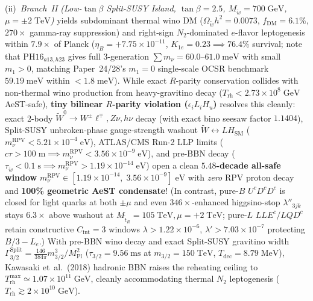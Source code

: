 \documentclass[11pt,a4paper]{article}
\begin{document}
\begin{enumerate}
\begin{itemize}
        (ii)~\emph{Branch~II (Low-$\tan\beta$ Split-SUSY Island, $\tan\beta=2.5$, $M_{\tilde w}=700\;\mathrm{GeV}$, $\mu=\pm 2\;\mathrm{TeV}$)} yields subdominant thermal wino DM ($\Omega_{\tilde w} h^2 = 0.0073$, $f_{\mathrm{DM}} = 6.1\%$, $270\times$ gamma-ray suppression) and right-sign $N_2$-dominated $e$-flavor leptogenesis within $7.9\times$ of Planck ($\eta_B = +7.75\times 10^{-11}$, $K_{1e}=0.23 \implies 76.4\%$ survival; note that $\mathrm{PH16}_{a13,h23}$ gives full 3-generation $\sum m_\nu = 60.0\text{--}61.0\;\mathrm{meV}$ with small $m_1>0$, matching Paper~24/28's $m_1=0$ single-scale OCSR benchmark $59.19\;\mathrm{meV}$ within $<1.8\;\mathrm{meV}$). While exact $R$-parity conservation collides with non-thermal wino production from heavy-gravitino decay ($T_{\mathrm{rh}} < 2.73\times 10^8\;\mathrm{GeV}$ AeST-safe), \textbf{tiny bilinear $R$-parity violation ($\epsilon_i L_i H_u$)} resolves this cleanly: exact 2-body $\tilde W^0 \to W^\pm\ell^\mp, Z\nu, h\nu$ decay (with exact bino seesaw factor $1.1404$), Split-SUSY unbroken-phase gauge-strength washout $\tilde W \leftrightarrow L H_{\mathrm{SM}}$ ($m_\nu^{\mathrm{RPV}} < 5.21\times 10^{-4}\;\mathrm{eV}$), ATLAS/CMS Run-2 LLP limits ($c\tau > 100\;\mathrm{m} \implies m_\nu^{\mathrm{RPV}} < 3.56\times 10^{-9}\;\mathrm{eV}$), and pre-BBN decay ($\tau_{\tilde w} < 0.1\;\mathrm{s} \implies m_\nu^{\mathrm{RPV}} > 1.19\times 10^{-14}\;\mathrm{eV}$) open a clean \textbf{$5.48$-decade all-safe window} $m_\nu^{\mathrm{RPV}} \in [1.19\times 10^{-14},\; 3.56\times 10^{-9}]\;\mathrm{eV}$ with \emph{zero} RPV proton decay and \textbf{100\% geometric AeST condensate}! (In contrast, pure-$B$ $U^c D^c D^c$ is closed for light quarks at both $\pm\mu$ and even $346\times$-enhanced higgsino-stop $\lambda''_{3jk}$ stays $6.3\times$ above washout at $M_{\tilde t_R}=105\;\mathrm{TeV}, \mu=+2\;\mathrm{TeV}$; pure-$L$ $LLE^c/LQD^c$ retain constructive $C_{\mathrm{int}}=3$ windows $\lambda > 1.22\times 10^{-6}$, $\lambda' > 7.03\times 10^{-7}$ protecting $B/3 - L_e$.) With pre-BBN wino decay and exact Split-SUSY gravitino width $\Gamma_{3/2}^{\mathrm{Split}} = \frac{146}{384\pi} m_{3/2}^3/M_{\mathrm{Pl}}^2$ ($\tau_{3/2}=9.56\;\mathrm{ms}$ at $m_{3/2}=150\;\mathrm{TeV}$, $T_{\mathrm{dec}}=8.79\;\mathrm{MeV}$), Kawasaki et~al.\ (2018) hadronic BBN raises the reheating ceiling to \textbf{$T_{\mathrm{rh}}^{\max} \simeq 1.07\times 10^{11}\;\mathrm{GeV}$}, cleanly accommodating thermal $N_2$ leptogenesis ($T_{\mathrm{rh}} \gtrsim 2\times 10^{10}\;\mathrm{GeV}$).

\end{itemize}
\end{enumerate}
\end{document}
